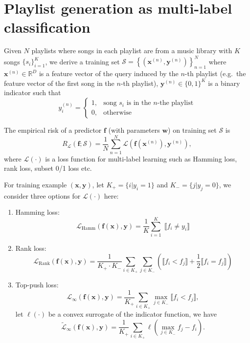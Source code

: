 \documentclass[9pt]{extarticle}
\newcommand{\llb}{\llbracket}
\newcommand{\rrb}{\rrbracket}
\newcommand{\f}{\mathbf{f}}
\newcommand{\x}{\mathbf{x}}
\newcommand{\y}{\mathbf{y}}
\newcommand{\1}{\mathbf{1}}
\newcommand{\w}{\mathbf{w}}
\newcommand{\R}{\mathbb{R}}
\newcommand{\LCal}{\mathcal{L}}
\newcommand{\SCal}{\mathcal{S}}
\newcommand{\pb}[1]{^{({#1})}}
\newcommand{\eg}{e.g.\ }
\begin{document}
\section{Playlist generation as multi-label classification}
\label{sec:playlist}


Given $N$ playlists where songs in each playlist are from a music library with $K$ songs $\{s_i\}_{i=1}^K$,
we derive a training set $\SCal = \left\{ \left( \x\pb{n}, \y\pb{n} \right) \right\}_{n=1}^N$ where $\x\pb{n} \in \R^D$ is a feature vector of the query 
induced by the $n$-th playlist (\eg the feature vector of the first song in the $n$-th playlist),
$\y\pb{n} \in \{0,1\}^K$ is a binary indicator such that 
$$
y_i\pb{n} = 
\begin{cases}
1, & \text{song $s_i$ is in the $n$-the playlist} \\
0, & \text{otherwise}
\end{cases}
$$

The empirical risk of a predictor $\f$ (with parameters $\w$) on training set $\SCal$ is
\begin{equation}
\label{eq:risk_pl}
R_{\LCal}(\f; \SCal) = \frac{1}{N} \sum_{n=1}^N \LCal\left(\f(\x\pb{n}), \y\pb{n}\right),
\end{equation}
where $\LCal(\cdot)$ is a loss function for multi-label learning such as Hamming loss, rank loss, subset 0/1 loss etc.

For training example $(\x, \y)$, let $K_+ = \{i |y_i = 1\}$ and $K_- = \{j |y_j = 0\}$, 
we consider three options for $\LCal(\cdot)$ here:
\begin{enumerate}
\item Hamming loss: 
      \begin{equation}
      \label{eq:loss_hamm_pl0}
      \LCal_\text{Hamm}(\f(\x), \y) = \frac{1}{K} \sum_{i=1}^K \; \llb f_i \ne y_i \rrb
      \end{equation}
\item Rank loss: 
      \begin{equation}
      \label{eq:loss_rank_pl0}
      \LCal_\text{Rank}(\f(\x), \y) = \frac{1}{K_+ \cdot K_-} \sum_{i \in K_+} \sum_{j \in K_-} 
                                      \left( \llb f_i < f_j \rrb + \frac{1}{2} \llb f_i = f_j \rrb \right)
      \end{equation}

\item Top-push loss:
      $$\LCal_\infty(\f(\x), \y) = \frac{1}{K_+} \sum_{i \in K_+} \max_{j \in K_-} \llb f_i < f_j \rrb,$$
      let $\ell(\cdot)$ be a convex surrogate of the indicator function, we have
      \begin{equation}
      \label{eq:loss_inf_pl}
      \widetilde{\LCal}_\infty(\f(\x), \y) = \frac{1}{K_+} \sum_{i \in K_+} \ell\left( \max_{j \in K_-} f_j - f_i \right).
      \end{equation}
\end{enumerate}
\end{document}

